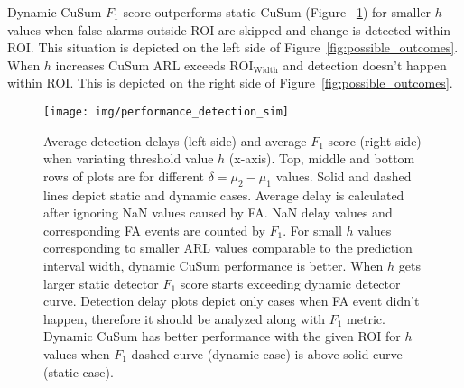 Dynamic CuSum $F_1$ score outperforms static CuSum (Figure ~\ref{fig:artificial_signal_perf_results}) for smaller $h$ values when false alarms outside ROI are skipped and change is detected within ROI. 
This situation is depicted on the left side of Figure~\ref{fig:possible_outcomes}.
When $h$ increases CuSum ARL exceeds $\text{ROI}_{\text{Width}}$ and detection doesn't happen within ROI.
This is depicted on the right side of Figure~\ref{fig:possible_outcomes}. 
\begin{figure}[!htb]
	\centering
	\texttt{[image: img/performance\_detection\_sim]}
	\caption{Average detection delays (left side) and average $F_1$ score (right side) when variating threshold value $h$ (x-axis).
	Top, middle and bottom rows of plots are for different $\delta = \mu_2 - \mu_1$ values.
	Solid and dashed lines depict static and dynamic cases.
    Average delay is calculated after ignoring NaN values caused by FA.
    NaN delay values and corresponding FA events are counted by $F_1$.
    For small $h$ values corresponding to smaller ARL values comparable to the prediction interval width, dynamic CuSum performance is better.
    When $h$ gets larger static detector $F_1$ score starts exceeding dynamic detector curve.
    Detection delay plots depict only cases when FA event didn't happen, therefore it should be analyzed along with $F_1$ metric.
    Dynamic CuSum has better performance with the given ROI for $h$ values when $F_1$ dashed curve (dynamic case) is above solid curve (static case).
	}
	\label{fig:artificial_signal_perf_results}
\end{figure}


